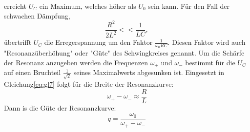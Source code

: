 erreicht $U_C$ ein Maximum, welches höher als $U_0$ sein kann.
Für den Fall der schwachen Dämpfung,
\begin{equation}
  \frac{R^2}{2L^2}<<\frac{1}{LC} ,
\end{equation}
übertrifft $U_C$ die Erregerspannung um den Faktor $\frac{1}{\omega_0 R C}$.
Diesen Faktor wird auch "Resonanzüberhöhung" oder "Güte" des Schwingkreises genannt.
Um die Schärfe der Resonanz anzugeben werden die Frequenzen $\omega_+$ und $\omega_-$ bestimmt für die $U_C$ auf einen Bruchteil $\frac{1}{\sqrt{2}}$ seines Maximalwerts abgesunken ist.
Eingesetzt in Gleichung\eqref{eq:gl7} folgt für die Breite der Resonanzkurve:
\begin{equation}
  \omega_+ - \omega_- \approx \frac{R}{L}
\end{equation}
Dann is die Güte der Resonanzkurve:
\begin{equation}
  q = \frac{\omega_0}{\omega_+ - \omega_-}
\end{equation}

